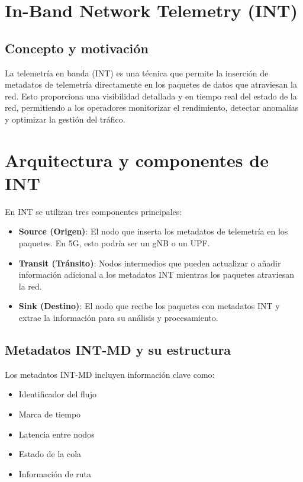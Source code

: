 \section{In-Band Network Telemetry (INT)}
\subsection{Concepto y motivación}
La telemetría en banda (INT) es una técnica que permite la inserción de metadatos de telemetría directamente en los paquetes de datos que atraviesan la red. Esto proporciona una visibilidad detallada y en tiempo real del estado de la red, permitiendo a los operadores monitorizar el rendimiento, detectar anomalías y optimizar la gestión del tráfico.
\section{Arquitectura y componentes de INT}
En INT se utilizan tres componentes principales:
\begin{itemize}
    \item \textbf{Source (Origen)}: El nodo que inserta los metadatos de telemetría en los paquetes. En 5G, esto podría ser un gNB o un UPF.
    \item \textbf{Transit (Tránsito)}: Nodos intermedios que pueden actualizar o añadir información adicional a los metadatos INT mientras los paquetes atraviesan la red.
    \item \textbf{Sink (Destino)}: El nodo que recibe los paquetes con metadatos INT y extrae la información para su análisis y procesamiento.
\end{itemize}
\subsection{Metadatos INT-MD y su estructura}
Los metadatos INT-MD incluyen información clave como:
\begin{itemize}
    \item Identificador del flujo
    \item Marca de tiempo
    \item Latencia entre nodos
    \item Estado de la cola
    \item Información de ruta
\end{itemize}


